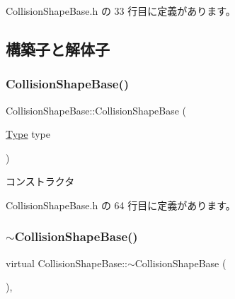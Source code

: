  Collision\+Shape\+Base.\+h の 33 行目に定義があります。



\subsection{構築子と解体子}
\mbox{\label{class_collision_shape_base_a9dd2ab42e2a6e96c6bff832ce8ca62b9}} 
\subsubsection{\texorpdfstring{Collision\+Shape\+Base()}{CollisionShapeBase()}}
{\footnotesize\ttfamily Collision\+Shape\+Base\+::\+Collision\+Shape\+Base (\begin{DoxyParamCaption}\item[{\mbox{\hyperlink{class_collision_shape_base_a8abcef092855ad0ca191047044b002cb}{Type}}}]{type }\end{DoxyParamCaption})\hspace{0.3cm}{\ttfamily [inline]}}



コンストラクタ 



 Collision\+Shape\+Base.\+h の 64 行目に定義があります。

\mbox{\label{class_collision_shape_base_a64fa9e1ae6b582be42360e926ce5d6cb}} 
\subsubsection{\texorpdfstring{$\sim$\+Collision\+Shape\+Base()}{~CollisionShapeBase()}}
{\footnotesize\ttfamily virtual Collision\+Shape\+Base\+::$\sim$\+Collision\+Shape\+Base (\begin{DoxyParamCaption}{ }\end{DoxyParamCaption})\hspace{0.3cm}{\ttfamily [inline]}, {\ttfamily [virtual]}}



